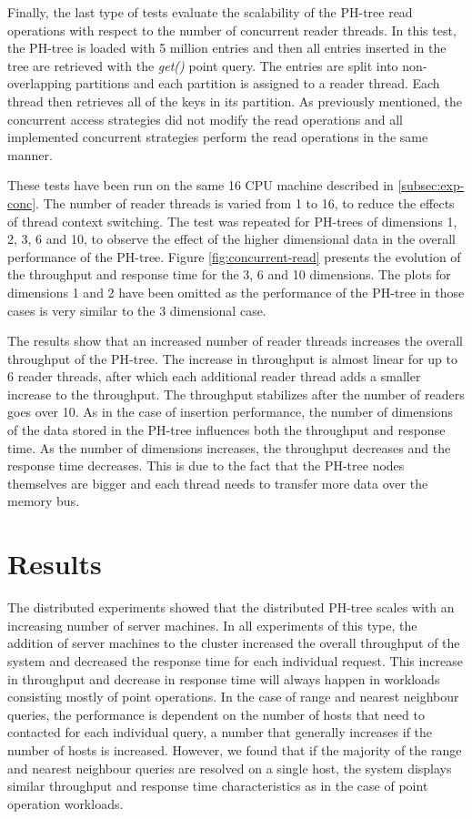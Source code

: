 \documentclass[11pt,a4paper]{globis-book}
\begin{document}
Finally, the last type of tests evaluate the scalability of the PH-tree read operations with respect to the number of concurrent reader threads. In this test, the PH-tree is loaded with 5 million entries and then all entries inserted in the tree are retrieved with the \textit{get()} point query. The entries are split into non-overlapping partitions and each partition is assigned to a reader thread. Each thread then retrieves all of the keys in its partition. As previously mentioned, the concurrent access strategies did not modify the read operations and all implemented concurrent strategies perform the read operations in the same manner. 

These tests have been run on the same 16 CPU machine described in \ref{subsec:exp-conc}. The number of reader threads is varied from 1 to 16, to reduce the effects of thread context switching. The test was repeated for PH-trees of dimensions 1, 2, 3, 6 and 10, to observe the effect of the higher dimensional data in the overall performance of the PH-tree. Figure \ref{fig:concurrent-read} presents the evolution of the throughput and response time for the 3, 6 and 10 dimensions. The plots for dimensions 1 and 2 have been omitted as the performance of the PH-tree in those cases is very similar to the 3 dimensional case. 

The results show that an increased number of reader threads increases the overall throughput of the PH-tree. The increase in throughput is almost linear for up to 6 reader threads, after which each additional reader thread adds a smaller increase to the throughput. The throughput stabilizes after the number of readers goes over 10. As in the case of insertion performance, the number of dimensions of the data stored in the PH-tree influences both the throughput and response time. As the number of dimensions increases, the throughput decreases and the response time decreases. This is due to the fact that the PH-tree nodes themselves are bigger and each thread needs to transfer more data over the memory bus.

\section{Results}
\label{sec:evaluation-results}

The distributed experiments showed that the distributed PH-tree scales with an increasing number of server machines. In all experiments of this type, the addition of server machines to the cluster increased the overall throughput of the system and decreased the response time for each individual request. This increase in throughput and decrease in response time will always happen in workloads consisting mostly of point operations. In the case of range and nearest neighbour queries, the performance is dependent on the number of hosts that need to contacted for each individual query, a number that generally increases if the number of hosts is increased. However, we found that if the majority of the range and nearest neighbour queries are resolved on a single host, the system displays similar throughput and response time characteristics as in the case of point operation workloads. 
\end{document}
